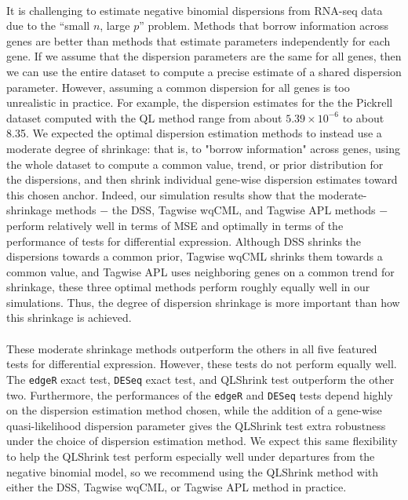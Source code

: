 \documentclass[10pt]{article}
\begin{document}
\paragraph{} \indent It is challenging to estimate negative binomial dispersions from RNA-seq data due to the ``small $n$, large $p$'' problem. Methods that borrow information across genes are better than methods that estimate parameters independently for each gene. If we assume that the dispersion parameters are the same for all genes, then we can use the entire dataset to compute a precise estimate of a shared dispersion parameter. However, assuming a common %
dispersion for all genes is too unrealistic in practice. For example, the dispersion estimates for the the Pickrell dataset computed with the QL method range from about $5.39 \times 10^{-6}$ to about 8.35. We expected the optimal dispersion estimation methods to instead use a moderate degree of shrinkage: that is, to "borrow information" across genes, using the whole dataset to compute a common value, trend, or prior distribution for the dispersions, and then shrink individual gene-wise dispersion estimates toward this chosen anchor. Indeed, our simulation results show that the moderate-shrinkage methods $-$ the DSS, Tagwise wqCML, and Tagwise APL methods $-$ perform relatively well in terms of MSE and optimally in terms of the performance of tests for differential expression. Although DSS shrinks the dispersions towards a common prior, Tagwise wqCML shrinks them towards a common value, and Tagwise APL uses neighboring genes on a common trend for shrinkage, these three optimal methods perform roughly equally well in our simulations. Thus, the degree of dispersion shrinkage is more important than how this shrinkage is achieved.

\paragraph{} \indent These moderate shrinkage methods outperform the others in all five featured tests for differential expression. However, these tests do not perform equally well. The {\tt edgeR} exact test, {\tt DESeq} exact test, and QLShrink test outperform the other two. Furthermore, the performances of the {\tt edgeR} and {\tt DESeq} tests depend highly on the dispersion estimation method chosen, while the addition of a gene-wise quasi-likelihood dispersion parameter gives the QLShrink test extra robustness under the choice of dispersion estimation method. We expect this same flexibility to help the QLShrink test perform especially well under departures from the negative binomial model, so we recommend using the QLShrink method with either the DSS, Tagwise wqCML, or Tagwise APL method in practice.
\end{document}

